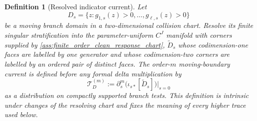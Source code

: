 \documentclass[11pt]{amsart}
\theoremstyle{compactplain}
\theoremstyle{compactdefinition}
\newtheorem{definition}[theorem]{Definition}
\theoremstyle{compactremark}
\begin{document}
\begin{definition}[Resolved indicator current]
\label{def:resolved_indicator_current}
Let
\[
  D_s=\{z:g_{1,s}(z)>0,\ldots,g_{\ell,s}(z)>0\}
\]
be a moving branch domain in a two-dimensional collision chart.  Resolve its
finite singular stratification into the parameter-uniform \(C^J\) manifold
with corners supplied by
\cref{ass:finite_order_clean_response_chart},
\(\widetilde D_s\) whose codimension-one faces are labelled by one generator
and whose codimension-two corners are labelled by an ordered pair of distinct
faces.  The order-\(m\) moving-boundary current is defined before any formal
delta multiplication by
\begin{equation}
\label{eq:resolved_indicator_definition}
  \mathcal T_{D}^{(m)}
  :=
  \partial_s^m\big(\iota_{s*}[\widetilde D_s]\big)\big|_{s=0}
\end{equation}
as a distribution on compactly supported branch tests.  This definition is
intrinsic under changes of the resolving chart and fixes the meaning of every
higher trace used below.
\end{definition}
\end{document}
